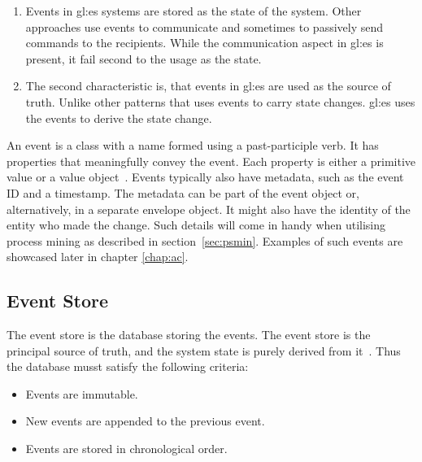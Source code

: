 \begin{enumerate}
  \item Events in \gls{gl:es} systems are stored as the state of the system. Other approaches use events to communicate and sometimes to passively send commands to the recipients. While the communication aspect in \gls{gl:es} is present, it fail second to the usage as the state.
  \item The second characteristic is, that events in \gls{gl:es} are used as the source of truth. Unlike other patterns that uses events to carry state changes. \Gls{gl:es} uses the events to derive the state change. 
\end{enumerate}

An event is a class with a name formed using a past-participle verb. It has properties that meaningfully convey the event. Each property is either a primitive value or a value object~\citep{richardson2018microservices}. Events typically also have metadata, such as the event ID and a timestamp. The metadata can be part of the event object or, alternatively, in a separate envelope object. It might also have the identity of the entity who made the change. Such details will come in handy when utilising process mining as described in section~\ref{sec:psmin}. Examples of such events are showcased later in chapter \ref{chap:ac}.


\subsection{Event Store}\label{subsec:est}

The event store is the database storing the events. The event store is the principal source of truth, and the system state is purely derived from it~\citep{esvsed}. Thus the database musst satisfy the following criteria:

\begin{itemize}
  \item Events are immutable.
  \item New events are appended to the previous event.
  \item Events are stored in chronological order.
\end{itemize}

